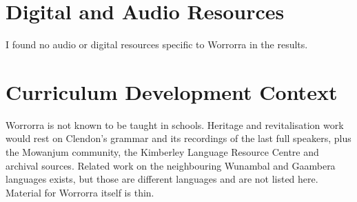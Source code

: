 \documentclass[12pt]{article}
\begin{document}
\section{Digital and Audio Resources}
I found no audio or digital resources specific to Worrorra in the results.

\section{Curriculum Development Context}
Worrorra is not known to be taught in schools. Heritage and revitalisation work would rest on Clendon's grammar and its recordings of the last full speakers, plus the Mowanjum community, the Kimberley Language Resource Centre and archival sources. Related work on the neighbouring Wunambal and Gaambera languages exists, but those are different languages and are not listed here. Material for Worrorra itself is thin.
\end{document}

